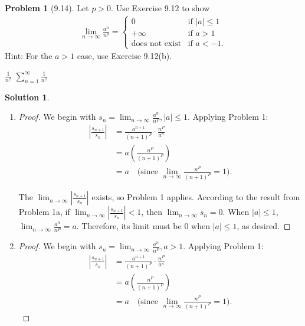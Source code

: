 \documentclass[12pt]{article}
\theoremstyle{definition} %
\newtheorem{solution}{Solution}
\newtheorem{problem}{Problem}
\theoremstyle{plain} %
\begin{document}
\begin{problem}[9.14]
    Let $p > 0$. Use Exercise 9.12 to show
    \begin{align}\lim_{n \to \infty} \frac{a^n}{n^p} = 
    \begin{cases} 
    0 & \text{if } |a| \leq 1 \\ 
    +\infty & \text{if } a > 1 \\ 
    \text{does not exist} & \text{if } a < -1.
    \end{cases}\end{align}
    Hint: For the $a > 1$ case, use Exercise 9.12(b).

\end{problem}
$\frac{1}{n^{2}}$ 
$\sum_{n=1}^{\infty} \frac{1}{n^{2}}$ 
\begin{solution}
\begin{enumerate}
    \item\begin{proof}
        We begin with $s_n = \lim_{n \to \infty} \frac{a^n}{n^P}, |a| \leq 1$. Applying Problem 1:
        \begin{align}
            \left| \frac{s_{n+1}}{s_n} \right| &= \frac{a^{n+1}}{(n+1)^P} \cdot \frac{n^P}{a^n} \tag{17} \\
            &= a \left( \frac{n^P}{(n+1)^P} \right) \tag{18} \\
            &= a \tag{19} \quad \text{(since } \lim_{n \to \infty} \frac{n^P}{(n+1)^P} = 1\text{)}.
        \end{align}
    
        The $\lim_{n \to \infty} \left| \frac{s_{n+1}}{s_n} \right|$ exists, so Problem 1 applies. According to the result from Problem 1a, if $\lim_{n \to \infty} \left| \frac{s_{n+1}}{s_n} \right| < 1$, then $\lim_{n \to \infty} s_n = 0$. When $|a| \leq 1$, $\lim_{n \to \infty} \frac{a^n}{n^P} = a$. Therefore, its limit must be 0 when $|a| \leq 1$, as desired. 
    \end{proof} 
    \item \begin{proof}
        We begin with $s_n = \lim_{n \to \infty} \frac{a^n}{n^P}, a > 1$. Applying Problem 1:
        \begin{align}
            \left| \frac{s_{n+1}}{s_n} \right| &= \frac{a^{n+1}}{(n+1)^P} \cdot \frac{n^P}{a^n} \tag{20} \\
            &= a \left( \frac{n^P}{(n+1)^P} \right) \tag{21} \\
            &= a \tag{22} \quad \text{(since } \lim_{n \to \infty} \frac{n^P}{(n+1)^P} = 1\text{)}.
        \end{align}
    

\end{proof}
\end{enumerate}
\end{solution}
\end{document}
